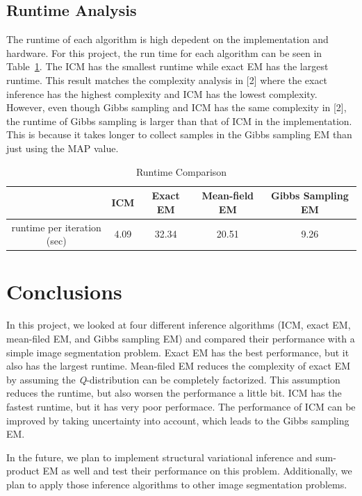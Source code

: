 \documentclass{article} %
\begin{document}
\subsection{Runtime Analysis}
\label{runtime}
The runtime of each algorithm is high depedent on the implementation and hardware. For this project, the run time for each algorithm can be seen in Table~\ref{tab:runtime}. The ICM has the smallest runtime while exact EM has the largest runtime.  This result matches the complexity analysis in [2] where the exact inference has the highest complexity and ICM has the lowest complexity. However, even though Gibbs sampling and ICM has the same complexity in [2], the runtime of Gibbs sampling is larger than that of ICM in the implementation. This is because it takes longer to collect samples in the Gibbs sampling EM than just using the MAP value.

\begin{table}[h]
\centering
\caption{Runtime Comparison}
\label{tab:runtime}
\begin{tabular}{|c|c|c|c|c|}
\hline
                            & ICM  & Exact EM & Mean-field EM & Gibbs Sampling EM \\ \hline
runtime per iteration (sec) & 4.09 & 32.34    & 20.51         & 9.26              \\ \hline
\end{tabular}
\end{table}

\section{Conclusions}
\label{conclusion}
In this project, we looked at four different inference algorithms (ICM, exact EM, mean-filed EM, and Gibbs sampling EM) and compared their performance with a simple image segmentation problem. Exact EM has the best performance, but it also has the largest runtime. Mean-filed EM reduces the complexity of exact EM by assuming the \textit{Q}-distribution can be completely factorized. This assumption reduces the runtime, but also worsen the performance a little bit. ICM has the fastest runtime, but it has very poor performace. The performance of ICM can be improved by taking uncertainty into account, which leads to the Gibbs sampling EM.

In the future, we plan to implement structural variational inference and sum-product EM as well and test their performance on this problem. Additionally, we plan to apply those inference algorithms to other image segmentation problems.
\end{document}
